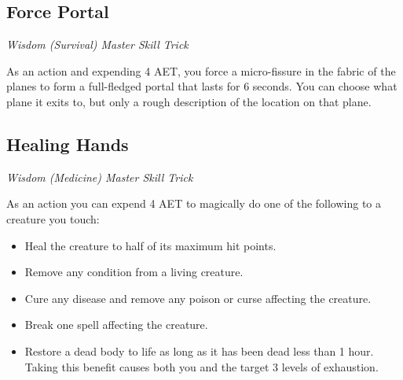 \subsection{Force Portal}

\textit{Wisdom (Survival) Master Skill Trick}

As an action and expending 4 AET, you force a micro-fissure in the fabric of the planes to form a full-fledged portal that lasts for 6 seconds. You can choose what plane it exits to, but only a rough description of the location on that plane.

\subsection{Healing Hands}

\textit{Wisdom (Medicine) Master Skill Trick}

As an action you can expend 4 AET to magically do one of the following to a creature you touch:
\begin{itemize}
	\item Heal the creature to half of its maximum hit points.
	\item Remove any condition from a living creature.
	\item Cure any disease and remove any poison or curse affecting the creature.
	\item Break one spell affecting the creature.
	\item Restore a dead body to life as long as it has been dead less than 1 hour. Taking this benefit causes both you and the target 3 levels of exhaustion.
\end{itemize}
